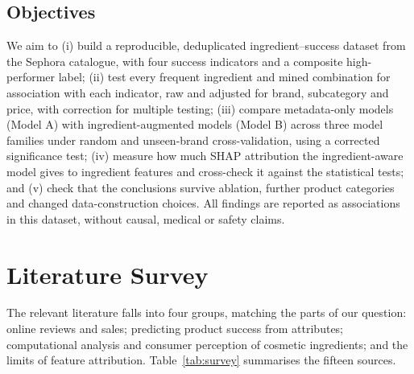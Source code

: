 \documentclass[11pt,a4paper]{article}
\begin{document}
\subsection{Objectives}
We aim to (i) build a reproducible, deduplicated ingredient--success dataset from the Sephora catalogue, with four success indicators and a composite high-performer label; (ii) test every frequent ingredient and mined combination for association with each indicator, raw and adjusted for brand, subcategory and price, with correction for multiple testing; (iii) compare metadata-only models (Model A) with ingredient-augmented models (Model B) across three model families under random and unseen-brand cross-validation, using a corrected significance test; (iv) measure how much SHAP attribution the ingredient-aware model gives to ingredient features and cross-check it against the statistical tests; and (v) check that the conclusions survive ablation, further product categories and changed data-construction choices. All findings are reported as associations in this dataset, without causal, medical or safety claims.

\section{Literature Survey}
The relevant literature falls into four groups, matching the parts of our question: online reviews and sales; predicting product success from attributes; computational analysis and consumer perception of cosmetic ingredients; and the limits of feature attribution. Table~\ref{tab:survey} summarises the fifteen sources.
\end{document}
